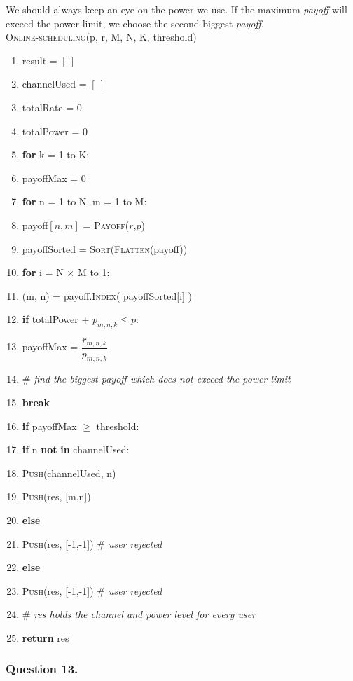 \documentclass[11pt, oneside]{report}
\begin{document}
We should always keep an eye on the power we use. If the maximum \textit{payoff} will exceed the power limit, we choose the second biggest \textit{payoff}. \\

\noindent\textsc{Online-scheduling}(p, r, M, N, K, threshold)
\begin{enumerate}[1\ ]
\setlength{\topsep}{0.05ex}
\setlength{\itemsep}{0.05ex}
\item result = $[\ ]$
\item channelUsed  = $[\ ]$
\item totalRate = 0
\item totalPower = 0
\item \textbf{for} k = 1 to K:
\item \qquad payoffMax = 0
\item \qquad \textbf{for} n = 1 to N, m = 1 to M:
\item \qquad \qquad payoff$[n, m]$ = \textsc{Payoff}($r$,$p$)
\item \qquad payoffSorted = \textsc{Sort}(\textsc{Flatten}(payoff))
\item \qquad \textbf{for} i = N $\times$ M to 1:
\item \qquad \qquad (m, n) = payoff.\textsc{Index}( payoffSorted[i] )
\item \qquad \qquad \textbf{if} totalPower + $p_{m,n,k} \leq p$:
\item \qquad \qquad \qquad payoffMax = $\dfrac{r_{m,n,k}}{p_{m,n,k}}$
\item \qquad \qquad \qquad $\#$ \textit{find the biggest payoff which does not exceed the power limit}
\item \qquad \qquad \qquad \textbf{break}
\item \qquad \textbf{if} payoffMax $\geq$ threshold:
\item \qquad \qquad \textbf{if} n \textbf{not} \textbf{in} channelUsed:
\item \qquad \qquad \qquad \textsc{Push}(channelUsed, n)
\item \qquad \qquad \qquad \textsc{Push}(res, [m,n])
\item \qquad \qquad \textbf{else}
\item \qquad \qquad \qquad \textsc{Push}(res, [-1,-1])   \textit{$\#$ user rejected}
\item \qquad \textbf{else}
\item \qquad \qquad \textsc{Push}(res, [-1,-1])   \textit{$\#$ user rejected}
\item $\#$ \textit{res holds the channel and power level for every user}
\item \textbf{return} res
\end{enumerate}

\subsubsection{Question 13. }
\end{document}
